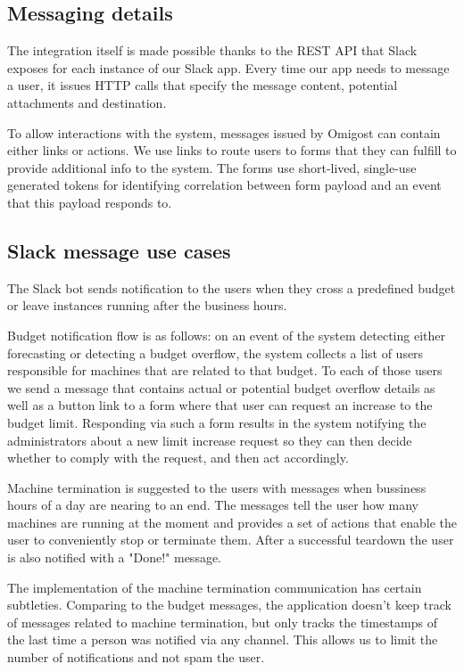 \documentclass[licencjacka,en]{thesisclass}
\begin{document}
    \subsection{Messaging details}

    The integration itself is made possible thanks to the REST API
    that Slack exposes for each instance of our Slack app.
    Every time our app needs to message a user, it issues HTTP
    calls that specify the message content, potential attachments and destination.

    To allow interactions with the system, messages issued by Omigost
    can contain either links or actions.
    We use links to route users to forms that they can fulfill
    to provide additional info to the system.
    The forms use short-lived, single-use generated tokens for identifying
    correlation between form payload and an event that this payload responds to.

    \subsection{Slack message use cases}

    The Slack bot sends notification to the users when they cross
    a predefined budget or leave instances running after the business hours.

    Budget notification flow is as follows: on an event of the system detecting
    either forecasting or detecting a budget overflow, the system collects
    a list of users responsible for machines that are related to that budget.
    To each of those users we send a message that contains actual or potential
    budget overflow details as well as a button link to a form where that user can request
    an increase to the budget limit.
    Responding via such a form results in the system notifying the administrators
    about a new limit increase request so they can then decide whether to comply
    with the request, and then act accordingly.

    Machine termination is suggested to the users with messages
    when bussiness hours of a day are nearing to an end.
    The messages tell the user how many machines are running at the moment
    and provides a set of actions that enable the user to conveniently stop
    or terminate them.
    After a successful teardown the user is also notified with a "Done!" message.

    The implementation of the machine termination communication has certain subtleties.
    Comparing to the budget messages, the application doesn’t keep track of messages
    related to machine termination, but
    only tracks the timestamps of the last time a person was notified via any channel.
    This allows us to limit the number of notifications and not spam the user.
\end{document}
